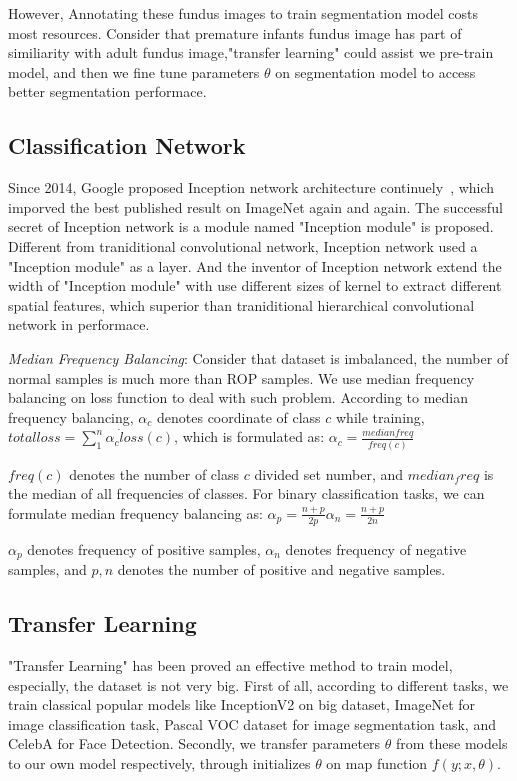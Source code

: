 \documentclass[10pt,twocolumn,letterpaper]{article}
\begin{document}
  However, Annotating these fundus images to train segmentation model costs most resources.
  Consider that premature infants fundus image has part of similiarity with adult fundus image,"transfer learning" could assist we pre-train model, and then we fine tune parameters $\theta$ on segmentation model to access better segmentation performace.

\subsection{Classification Network}
  Since 2014, Google proposed Inception network architecture continuely~\cite{03, 04, 05, 06}, which imporved the best published result on ImageNet again and again. The successful secret of Inception network is a module named "Inception module" is proposed. Different from traniditional convolutional network, Inception network used a "Inception module"  as a layer. And the inventor of Inception network extend the width of "Inception module" with use different sizes of kernel to extract different spatial features, which superior than traniditional hierarchical convolutional network in performace.

  \emph{Median Frequency Balancing}: Consider that dataset is imbalanced, the number of normal samples is much more than ROP samples. We use median frequency balancing on loss function to deal with such problem. According to median frequency balancing, ${\alpha}_c$ denotes coordinate of class $c$ while training, \eg $ total loss = \sum_1^{n} {{{\alpha}_c} \dot loss(c)}$, which is formulated as:
  \begin{math}
    {\alpha}_c = \frac{median freq}{freq(c)}
  \end{math}

  $freq(c)$ denotes the number of class $c$ divided set number, and $median_freq$ is the median of all frequencies of classes. For binary classification tasks, we can formulate median frequency balancing as:
  \begin{math}
    {\alpha}_p = \frac{n + p}{2 \dot p}
    {\alpha}_n = \frac{n + p}{2 \dot n}
  \end{math}

  ${\alpha}_p$ denotes frequency of positive samples, ${\alpha}_n$ denotes frequency of negative samples, and $p, n$ denotes the number of positive and negative samples.

\subsection{Transfer Learning}
    "Transfer Learning" has been proved an effective method to train model, especially, the dataset is not very big. First of all, according to different tasks, we train classical popular models like InceptionV2 on big dataset, \eg ImageNet for image classification task, Pascal VOC dataset for image segmentation task, and CelebA for Face Detection. Secondly, we transfer parameters $\theta$ from these models to our own model respectively, through initializes $\theta$ on map function $f(y;x, \theta)$.
\end{document}
